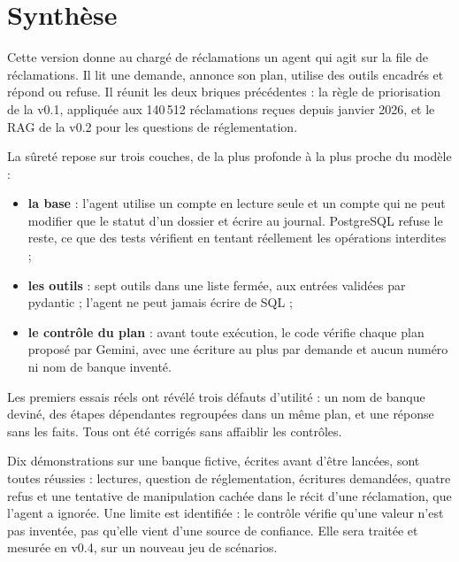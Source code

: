 \documentclass[11pt,a4paper]{article}
\begin{document}

\section*{Synthèse}

Cette version donne au chargé de réclamations un agent qui agit sur la file de réclamations. Il lit une demande, annonce son plan, utilise des outils encadrés et répond ou refuse. Il réunit les deux briques précédentes : la règle de priorisation de la v0.1, appliquée aux 140\,512 réclamations reçues depuis janvier 2026, et le RAG de la v0.2 pour les questions de réglementation.

La sûreté repose sur trois couches, de la plus profonde à la plus proche du modèle :
\begin{itemize}
  \item \textbf{la base} : l'agent utilise un compte en lecture seule et un compte qui ne peut modifier que le statut d'un dossier et écrire au journal. PostgreSQL refuse le reste, ce que des tests vérifient en tentant réellement les opérations interdites ;
  \item \textbf{les outils} : sept outils dans une liste fermée, aux entrées validées par pydantic ; l'agent ne peut jamais écrire de SQL ;
  \item \textbf{le contrôle du plan} : avant toute exécution, le code vérifie chaque plan proposé par Gemini, avec une écriture au plus par demande et aucun numéro ni nom de banque inventé.
\end{itemize}

Les premiers essais réels ont révélé trois défauts d'utilité : un nom de banque deviné, des étapes dépendantes regroupées dans un même plan, et une réponse sans les faits. Tous ont été corrigés sans affaiblir les contrôles.

Dix démonstrations sur une banque fictive, écrites avant d'être lancées, sont toutes réussies : lectures, question de réglementation, écritures demandées, quatre refus et une tentative de manipulation cachée dans le récit d'une réclamation, que l'agent a ignorée. Une limite est identifiée : le contrôle vérifie qu'une valeur n'est pas inventée, pas qu'elle vient d'une source de confiance. Elle sera traitée et mesurée en v0.4, sur un nouveau jeu de scénarios.

\setcounter{tocdepth}{1}
\tableofcontents
\newpage
\end{document}
